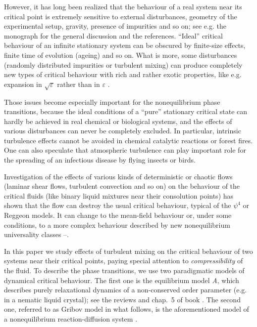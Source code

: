 \documentclass[12pt]{article}
\begin{document}
However, it has long been realized that the behaviour of a real system
near its critical point is extremely sensitive to external disturbances,
geometry of the experimental setup, gravity, presence of impurities and
so on; see e.g. the monograph \cite{Ivanov} for the general discussion and
the references. ``Ideal''  critical behaviour of an infinite stationary
system can be obscured by
finite-size effects, finite time of evolution (ageing) and so on.
What is more, some disturbances (randomly distributed impurities or
turbulent mixing) can produce completely new types of critical
behaviour with rich and rather exotic properties, like e.g. expansion in
$\sqrt{\varepsilon}$ rather than in $\varepsilon$  \cite{quench,Satten}.

Those issues become especially important for the nonequilibrium phase
transitions, because the ideal conditions of a ``pure'' stationary critical
state can hardly be achieved in real chemical or biological systems, and
the effects of various disturbances can never be completely excluded.
In particular, intrinsic turbulence effects cannot be avoided in
chemical catalytic reactions or forest fires. One can also speculate that
atmospheric turbulence can play important role for the spreading of an
infectious disease by flying insects or birds.

Investigation of the effects of various kinds of deterministic or chaotic
flows (laminar shear flows, turbulent convection and so on) on the behaviour
of the critical fluids (like binary liquid mixtures near their consolution
points) has shown that the flow can destroy the usual critical behaviour,
typical of the $\psi^{4}$ or Reggeon models. It can change to the mean-field
behaviour or, under some conditions, to a more complex behaviour described
by new nonequilibrium universality classes \cite{Satten}--\cite{AIM}.

In this paper we study effects of turbulent mixing on the critical behaviour
of two systems near their critical points, paying special attention to
{\it compressibility} of the fluid. To describe the phase transitions,
we use two
paradigmatic models of dynamical critical behaviour. The first one is the
equilibrium model {\it A}, which describes purely relaxational dynamics of
a non-conserved order parameter (e.g. in a nematic liquid crystal);
see the reviews \cite{HH} and chap.~5 of book \cite{Book3}. The second one,
referred to as Gribov model in what follows, is the aforementioned model
of a nonequilibrium reaction-diffusion system \cite{Hinr,JT}.
\end{document}
